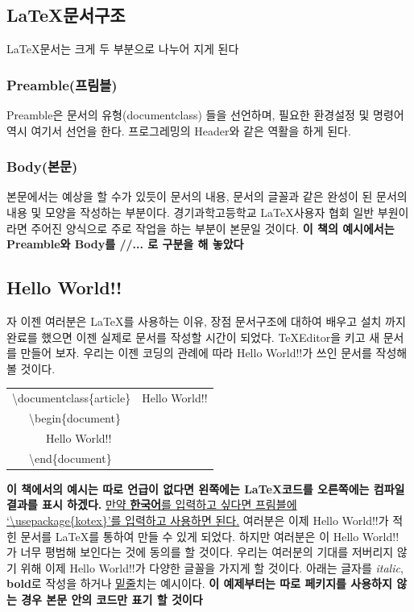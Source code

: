 \documentclass[12pt]{article}
\begin{document}
	\subsection{\LaTeX 문서구조}
	\LaTeX 문서는 크게 두 부분으로 나누어 지게 된다
	\subsubsection{Preamble(프림블)}
	Preamble은 문서의 유형(documentclass) 들을 선언하며, 필요한 환경설정 및 명령어 역시 여기서 선언을 한다. 프로그레밍의 Header와 같은 역활을 하게 된다.
	\subsubsection{Body(본문)}
	본문에서는 예상을 할 수가 있듯이 문서의 내용, 문서의 글꼴과 같은 완성이 된 문서의 내용 및 모양을 작성하는 부분이다. 경기과학고등학교  \LaTeX 사용자 협회 일반 부원이라면 주어진 양식으로 주로 작업을 하는 부분이 본문일 것이다.
	\newline
	\newline
	{\bf 이 책의 예시에서는 Preamble와 Body를 //... 로 구분을 해 놓았다}
	\clearpage
	\subsection{Hello World!!}
	자 이젠 여러분은 \LaTeX 를 사용하는 이유, 장점 문서구조에 대하여 배우고 설치 까지 완료를 했으면 이젠 실제로 문서를 작성할 시간이 되었다. \TeX Editor을 키고 새 문서를 만들어 보자. 우리는 이젠 코딩의 관례에 따라 Hello World!!가 쓰인 문서를 작성해 볼 것이다.\newline
	
		\begin{tabularx}{\textwidth \onehalfspacing}{ |X|X| }		
			\hline
			\textbackslash documentclass\{article\}&Hello World!!\\
			\ \ \ \textbackslash begin\{document\}		& \\
			\ \ \ \ \ \ Hello World!!			& \\
			\ \ \ \textbackslash end\{document\}			& \\
			\hline
		\end{tabularx}
		\newline
		\newline
	{\bf 이 책에서의 예시는 따로 언급이 없다면 왼쪽에는 \LaTeX 코드를 오른쪽에는 컴파일 결과를 표시 하겠다.}\newline
	\underline{만약 {\bf 한국어}를 입력하고 싶다면 프림블에 `\textbackslash usepackage\{kotex\}'를 입력하고 사용하면 된다.}\newline\newline
	여러분은 이제 Hello World!!가 적힌 문서를 \LaTeX 를 통하여 만들 수 있게 되었다. 하지만 여러분은 이 Hello World!! 가 너무 평범해 보인다는 것에 동의를 할 것이다. 우리는 여러분의 기대를 저버리지 않기 위해 이제 Hello World!!가 다양한 글꼴을 가지게 할 것이다.
	\newline\newline
	아래는 글자를 {\it italic}, {\bf bold}로 작성을 하거나 \underline{밑줄}치는 예시이다.
	\newline
	{\bf 이 예제부터는 따로 페키지를 사용하지 않는 경우 본문 안의 코드만 표기 할 것이다}\newline
	
\end{document}
